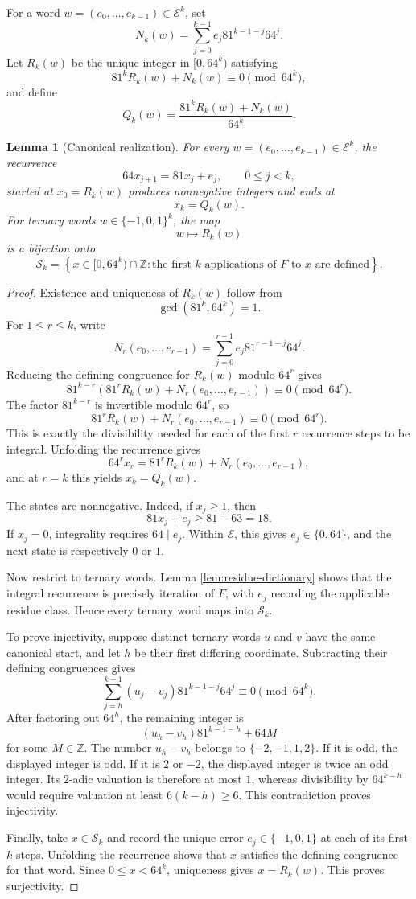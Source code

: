 \documentclass[11pt]{article}
\newtheorem{lemma}[theorem]{Lemma}
\theoremstyle{definition}
\theoremstyle{remark}
\newcommand{\Z}{\mathbb{Z}}
\newcommand{\E}{\mathcal{E}}
\begin{document}
For a word $w=(e_0,\ldots,e_{k-1})\in\E^k$, set
\[
N_k(w)=\sum_{j=0}^{k-1}e_j81^{k-1-j}64^j.
\]
Let $R_k(w)$ be the unique integer in $[0,64^k)$ satisfying
\[
81^kR_k(w)+N_k(w)\equiv0\pmod{64^k},
\]
and define
\[
Q_k(w)=\frac{81^kR_k(w)+N_k(w)}{64^k}.
\]

\begin{lemma}[Canonical realization]
\label{lem:canonical-realization}
For every $w=(e_0,\ldots,e_{k-1})\in\E^k$, the recurrence
\[
64x_{j+1}=81x_j+e_j,
\qquad 0\le j<k,
\]
started at $x_0=R_k(w)$ produces nonnegative integers and ends at
\[
x_k=Q_k(w).
\]
For ternary words $w\in\{-1,0,1\}^k$, the map
\[
w\longmapsto R_k(w)
\]
is a bijection onto
\[
\mathcal S_k=
\left\{x\in[0,64^k)\cap\Z:
\text{the first $k$ applications of $F$ to $x$ are defined}
\right\}.
\]
\end{lemma}

\begin{proof}
Existence and uniqueness of $R_k(w)$ follow from
\[
\gcd(81^k,64^k)=1.
\]
For $1\le r\le k$, write
\[
N_r(e_0,\ldots,e_{r-1})
=\sum_{j=0}^{r-1}e_j81^{r-1-j}64^j.
\]
Reducing the defining congruence for $R_k(w)$ modulo $64^r$ gives
\[
81^{k-r}
\left(
81^rR_k(w)+N_r(e_0,\ldots,e_{r-1})
\right)
\equiv0\pmod{64^r}.
\]
The factor $81^{k-r}$ is invertible modulo $64^r$, so
\[
81^rR_k(w)+N_r(e_0,\ldots,e_{r-1})
\equiv0\pmod{64^r}.
\]
This is exactly the divisibility needed for each of the first $r$ recurrence steps to be integral. Unfolding the recurrence gives
\[
64^rx_r=81^rR_k(w)+N_r(e_0,\ldots,e_{r-1}),
\]
and at $r=k$ this yields $x_k=Q_k(w)$.

The states are nonnegative. Indeed, if $x_j\ge1$, then
\[
81x_j+e_j\ge81-63=18.
\]
If $x_j=0$, integrality requires $64\mid e_j$. Within $\E$, this gives $e_j\in\{0,64\}$, and the next state is respectively $0$ or $1$.

Now restrict to ternary words. Lemma \ref{lem:residue-dictionary} shows that the integral recurrence is precisely iteration of $F$, with $e_j$ recording the applicable residue class. Hence every ternary word maps into $\mathcal S_k$.

To prove injectivity, suppose distinct ternary words $u$ and $v$ have the same canonical start, and let $h$ be their first differing coordinate. Subtracting their defining congruences gives
\[
\sum_{j=h}^{k-1}(u_j-v_j)81^{k-1-j}64^j
\equiv0\pmod{64^k}.
\]
After factoring out $64^h$, the remaining integer is
\[
(u_h-v_h)81^{k-1-h}+64M
\]
for some $M\in\Z$. The number $u_h-v_h$ belongs to $\{-2,-1,1,2\}$. If it is odd, the displayed integer is odd. If it is $2$ or $-2$, the displayed integer is twice an odd integer. Its $2$-adic valuation is therefore at most $1$, whereas divisibility by $64^{k-h}$ would require valuation at least $6(k-h)\ge6$. This contradiction proves injectivity.

Finally, take $x\in\mathcal S_k$ and record the unique error $e_j\in\{-1,0,1\}$ at each of its first $k$ steps. Unfolding the recurrence shows that $x$ satisfies the defining congruence for that word. Since $0\le x<64^k$, uniqueness gives $x=R_k(w)$. This proves surjectivity.
\end{proof}
\end{document}
